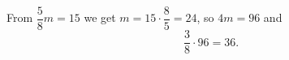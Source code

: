 From $\dfrac{5}{8}m=15$ we get $m=15\cdot\dfrac{8}{5}=24$, so $4m=96$ and
\[
\dfrac{3}{8}\cdot96=\boxed{36}.
\]
